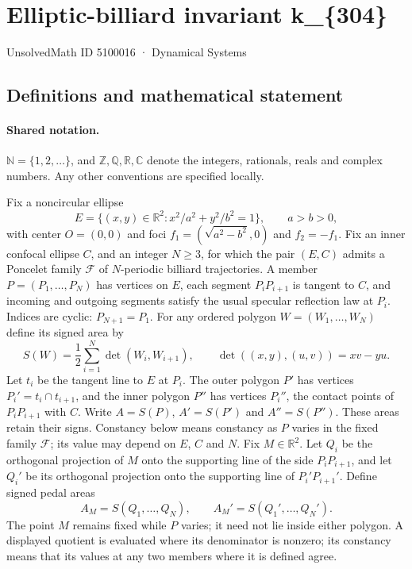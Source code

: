 \documentclass[11pt]{article}
\begin{document}
\setcounter{section}{5100015}
\section{Elliptic-billiard invariant k\_\{304\}}\label{5100016}
{\small\sffamily UnsolvedMath ID 5100016 · Dynamical Systems}
\subsection{Definitions and mathematical statement}

\paragraph{Shared notation.}$\mathbb N=\{1,2,\ldots\}$, and $\mathbb Z,\mathbb Q,\mathbb R,\mathbb C$ denote the integers, rationals, reals and complex numbers. Any other conventions are specified locally.


Fix a noncircular ellipse
\[
E=\{(x,y)\in\mathbb R^2:x^2/a^2+y^2/b^2=1\},\qquad a>b>0,
\]
with center $O=(0,0)$ and foci $f_1=(\sqrt{a^2-b^2},0)$ and $f_2=-f_1$. Fix an inner confocal ellipse $C$, and an integer $N\geq3$, for which the pair $(E,C)$ admits a Poncelet family $\mathcal F$ of $N$-periodic billiard trajectories. A member $P=(P_1,\ldots,P_N)$ has vertices on $E$, each segment $P_iP_{i+1}$ is tangent to $C$, and incoming and outgoing segments satisfy the usual specular reflection law at $P_i$. Indices are cyclic: $P_{N+1}=P_1$.
For any ordered polygon $W=(W_1,\ldots,W_N)$ define its signed area by
\[
S(W)=\frac12\sum_{i=1}^N\det(W_i,W_{i+1}),\qquad
\det((x,y),(u,v))=xv-yu.
\]
Let $t_i$ be the tangent line to $E$ at $P_i$. The outer polygon $P'$ has vertices $P_i'=t_i\cap t_{i+1}$, and the inner polygon $P''$ has vertices $P_i''$, the contact points of $P_iP_{i+1}$ with $C$. Write $A=S(P)$, $A'=S(P')$ and $A''=S(P'')$. These areas retain their signs. Constancy below means constancy as $P$ varies in the fixed family $\mathcal F$; its value may depend on $E$, $C$ and $N$.
Fix $M\in\mathbb R^2$. Let $Q_i$ be the orthogonal projection of $M$ onto the supporting line of the side $P_iP_{i+1}$, and let $Q_i'$ be its orthogonal projection onto the supporting line of $P_i'P_{i+1}'$. Define signed pedal areas
\[
A_M=S(Q_1,\ldots,Q_N),\qquad A_M'=S(Q_1',\ldots,Q_N').
\]
The point $M$ remains fixed while $P$ varies; it need not lie inside either polygon.
A displayed quotient is evaluated where its denominator is nonzero; its constancy means that its values at any two members where it is defined agree.
\end{document}
